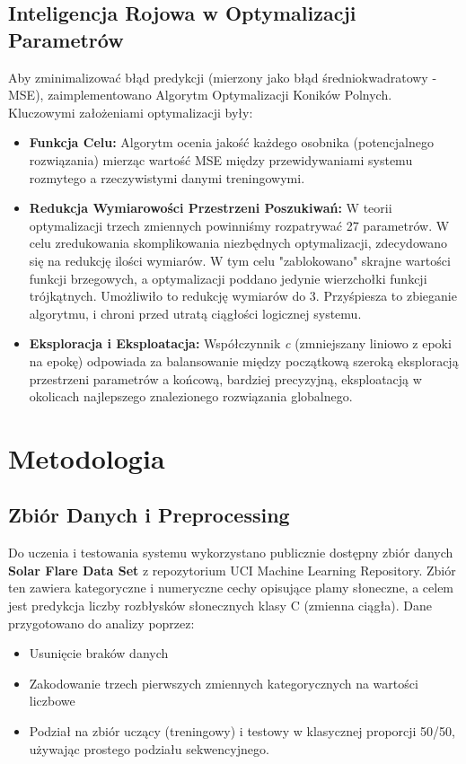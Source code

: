 \documentclass[12pt, a4paper]{article}
\begin{document}
\subsection{Inteligencja Rojowa w Optymalizacji Parametrów}
Aby zminimalizować błąd predykcji (mierzony jako błąd średniokwadratowy - MSE), 
zaimplementowano Algorytm Optymalizacji Koników Polnych. Kluczowymi założeniami optymalizacji były:
\begin{itemize}
    \item \textbf{Funkcja Celu:} Algorytm ocenia jakość każdego osobnika (potencjalnego rozwiązania) mierząc wartość MSE między przewidywaniami systemu rozmytego a rzeczywistymi danymi treningowymi.
    \item \textbf{Redukcja Wymiarowości Przestrzeni Poszukiwań:} W teorii optymalizacji trzech zmiennych powinniśmy rozpatrywać 27 parametrów. W celu zredukowania skomplikowania niezbędnych optymalizacji, zdecydowano się na redukcję ilości wymiarów. 
        W tym celu "zablokowano" skrajne wartości funkcji brzegowych, a optymalizacji poddano jedynie wierzchołki funkcji trójkątnych. Umożliwiło to redukcję wymiarów do 3. Przyśpiesza to zbieganie algorytmu, i chroni przed utratą ciągłości logicznej systemu.
    \item \textbf{Eksploracja i Eksploatacja:} Współczynnik \textit{c} (zmniejszany liniowo z epoki na epokę) odpowiada za balansowanie między początkową szeroką eksploracją przestrzeni parametrów a końcową, bardziej precyzyjną, eksploatacją w okolicach najlepszego znalezionego rozwiązania globalnego.
\end{itemize} 

\section{Metodologia}
\subsection{Zbiór Danych i Preprocessing}
Do uczenia i testowania systemu wykorzystano publicznie dostępny zbiór danych \textbf{Solar Flare Data Set} z repozytorium UCI Machine Learning Repository. Zbiór ten zawiera kategoryczne i numeryczne cechy opisujące plamy słoneczne, a celem jest predykcja liczby rozbłysków słonecznych klasy C (zmienna ciągła).
Dane przygotowano do analizy poprzez:
\begin{itemize}
    \item Usunięcie braków danych
    \item Zakodowanie trzech pierwszych zmiennych kategorycznych na wartości liczbowe
    \item Podział na zbiór uczący (treningowy) i testowy w klasycznej proporcji 50/50, używając prostego podziału sekwencyjnego. 
\end{itemize}
\end{document}
